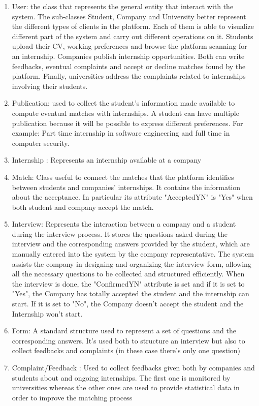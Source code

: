 \documentclass{article}
\begin{document}
\begin{enumerate}
    \item User: the class that represents the general entity that interact with the system. The sub-classes Student, Company and University better represent the different types of clients in the platform. Each of them is able to visualize different part of the system and carry out different operations on it. Students upload their CV, working preferences and browse the platform scanning for an internship. Companies publish internship opportunities. Both can write feedbacks, eventual complaints and accept or decline matches found by the platform. Finally, universities address the complaints related to internships involving their students.
    \item Publication: used to collect the student's information made available to compute eventual matches with internships. A student can have multiple publication because it will be possible to express different preferences. For example: Part time internship in software engineering and full time in computer security.
    \item Internship : Represents an internship available at a company
    \item Match: Class useful to connect the matches that the platform identifies between students and companies' internships. It contains the information about the acceptance. In particular its attribute "AcceptedYN" is "Yes" when both student and company accept the match.
    \item Interview: Represents the interaction between a company and a student during the interview process. It stores the questions asked during the interview and the corresponding answers provided by the student, which are manually entered into the system by the company representative. The system assists the company in designing and organizing the interview form, allowing all the necessary questions to be collected and structured efficiently. When the interview is done, the "ConfirmedYN" attribute is set and if it is set to "Yes", the Company has totally accepted the student and the internship can start. If it is set to "No", the Company doesn't accept the student and the Internship won't start.
    
    \item Form: A standard structure used to represent a set of questions and the corresponding answers. It's used both to structure an interview but also to collect feedbacks and complaints (in these case there's only one question)
    \item Complaint/Feedback : Used to collect feedbacks given both by companies and students about and ongoing internships. The first one is monitored by universities whereas the other ones are used to provide statistical data in order to improve the matching process 
    
    
\end{enumerate}
\end{document}
